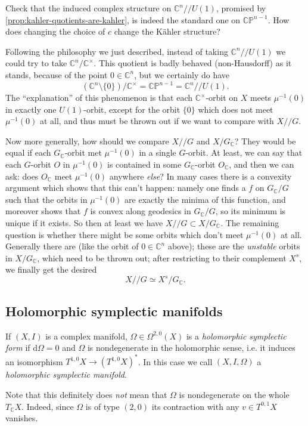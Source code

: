 \documentclass[12pt,letterpaper,reqno]{article}
\numberwithin{equation}{section}
\newcommand{\C}{\ensuremath{\mathbb C}}
\newcommand{\PP}{\ensuremath{\mathbb P}}
\newcommand{\kahler}{K\"ahler\xspace}
\newcommand{\kq}{/\!\!/}
\newcommand{\de}{\mathrm{d}}
\newcommand{\ti}[1]{\textit{#1}}
\begin{document}
\begin{exercise}
Check that the induced complex structure on $\C^n \kq U(1)$,
promised by \autoref{prop:kahler-quotients-are-kahler}, is indeed
the standard one on $\C\PP^{n-1}$. How does changing
the choice of $c$ change the \kahler structure?
\end{exercise}

Following the philosophy we just described, instead of taking
$\C^n \kq U(1)$ we could try to take $\C^n / \C^\times$.
This quotient is badly behaved (non-Hausdorff) as it stands, because of the
point $0 \in \C^n$, but we certainly do have
\begin{equation}
  (\C^n \setminus \{0\}) / \C^\times = \C\PP^{n-1} = \C^n \kq U(1).
\end{equation}
The ``explanation'' of this phenomenon is that each
$\C^\times$-orbit on $X$ meets $\mu^{-1}(0)$ in
exactly one $U(1)$-orbit,
except for the orbit $\{0\}$ which does not
meet $\mu^{-1}(0)$ at all, and thus must be thrown out
if we want to compare with $X \kq G$.

Now more generally, how should we compare $X \kq G$ and $X / G_\C$?
They would be equal if each $G_\C$-orbit met $\mu^{-1}(0)$
in a single $G$-orbit. At least, we can say that
each $G$-orbit $O$ in $\mu^{-1}(0)$ is contained in some $G_\C$-orbit $O_\C$,
and then we can ask: does $O_\C$ meet $\mu^{-1}(0)$ anywhere \ti{else}?
In many cases there is a convexity argument which shows
that this can't happen: namely one finds a $f$ on $G_\C / G$
such that the orbits in $\mu^{-1}(0)$ are
exactly the minima of this function, and moreover shows that $f$
is convex along geodesics in $G_\C / G$, so its minimum is unique
if it exists. So then at least we have
$X \kq G \subset X / G_\C$. The remaining question is whether there might
be some orbits which don't meet $\mu^{-1}(0)$ at all. Generally there are
(like the orbit of $0 \in \C^n$ above);
these are the \ti{unstable} orbits in $X / G_\C$, which need to be
thrown out; after restricting to their complement $X^s$, we finally get
the desired
\begin{equation}
  X \kq G \simeq X^s / G_\C.
\end{equation}


\subsection{Holomorphic symplectic manifolds}

\begin{defn} If $(X,I)$ is a complex manifold,
$\Omega \in \Omega^{2,0}(X)$ is a \ti{holomorphic
symplectic form} if $\de \Omega = 0$
and $\Omega$ is nondegenerate
in the holomorphic sense, i.e. it induces
an isomorphism $T^{1,0}X \to (T^{1,0} X)^*$.
In this case we call $(X,I,\Omega)$ a \ti{holomorphic symplectic
manifold}.
\end{defn}
Note that this definitely does \ti{not} mean that $\Omega$ is nondegenerate on the whole $T_\C X$. Indeed, since $\Omega$ is
of type $(2,0)$ its contraction with any $v \in T^{0,1} X$ vanishes.
\end{document}
